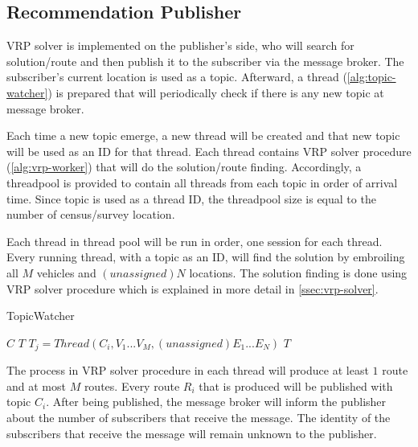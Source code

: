 \documentclass[conference]{IEEEtran}
\begin{document}
\subsection{Recommendation Publisher}
\label{ssec:recommendation-publisher}
VRP solver is implemented on the publisher's side, who will search for solution/route and then publish it to the subscriber via the message broker. The subscriber's current location is used as a topic. Afterward, a thread  (\autoref{alg:topic-watcher}) is prepared that will periodically check if there is any new topic at message broker. 

Each time a new topic emerge, a new thread will be created and that new topic will be used as an ID for that thread. Each thread contains VRP solver procedure (\autoref{alg:vrp-worker}) that will do the solution/route finding. Accordingly, a threadpool is provided to contain all threads from each topic in order of arrival time. Since topic is used as a thread ID, the threadpool size is equal to the number of census/survey location. 


Each thread in thread pool will be run in order, one session for each thread. Every running thread, with a topic as an ID, will find the solution by embroiling all $M$ vehicles and $(unassigned) N$ locations. The solution finding is done using VRP solver procedure which is explained in more detail in \autoref{ssec:vrp-solver}.


\begin{algorithm}[h]
	\caption{TopicWatcher}
	\label{alg:topic-watcher}
	\begin{algorithmic}[1]
		\renewcommand{\algorithmicrequire}{\textbf{Input:}}
		\renewcommand{\algorithmicensure}{\textbf{Output:}}
		\REQUIRE $C$
		\ENSURE  $T$
					\STATE $T_j = Thread(C_i, V_1...V_M, (unassigned) E_1...E_N)$
				\ENDIF
			\ENDFOR
		\ENDFOR
		\RETURN $T$
	\end{algorithmic}
\end{algorithm}


The process in VRP solver procedure in each thread will produce at least $1$ route and at most $M$ routes. Every route $R_i$ that is produced will be published with topic $C_i$. After being published, the message broker will inform the publisher about the number of subscribers that receive the message. The identity of the subscribers that receive the message will remain unknown to the publisher. 
\end{document}
